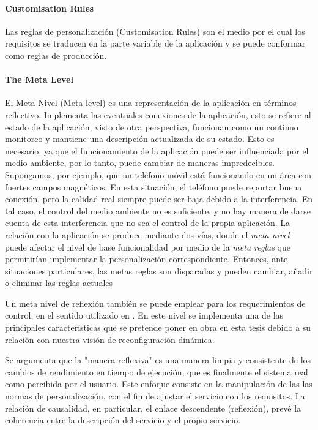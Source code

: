 \paragraph{Customisation Rules}

Las reglas de personalización (Customisation Rules) son el medio por el cual los requisitos se traducen en la parte variable de la aplicación y se puede conformar como reglas de producción.


\paragraph{The Meta Level}

El Meta Nivel (Meta level) es una representación de la aplicación en términos reflectivo. Implementa las eventuales conexiones de la aplicación, esto se refiere al estado de la aplicación, visto de otra perspectiva, funcionan como
un continuo monitoreo y mantiene una descripción actualizada de su estado. Esto es necesario, ya que el funcionamiento de la aplicación puede ser influenciada por el medio ambiente, por lo tanto, puede cambiar de maneras impredecibles. Supongamos, por ejemplo, que un teléfono móvil está funcionando en un área con fuertes campos magnéticos. En esta situación, el teléfono puede reportar buena conexión, pero la calidad real siempre puede ser baja debido a la interferencia. En tal caso, el control del medio ambiente no es suficiente, y no hay manera de darse cuenta de esta interferencia que no sea el control de la propia aplicación. La relación con la aplicación se produce mediante dos vías, donde el \textit{meta nivel } puede afectar el nivel de base funcionalidad por medio de la \textit{meta reglas} que permitirían implementar la personalización correspondiente. Entonces, ante situaciones particulares, las metas reglas son disparadas y pueden cambiar, añadir o eliminar las reglas actuales

Un meta nivel de reflexión también se puede emplear para los requerimientos de control, en el sentido utilizado en \cite{UWA5}. En este nivel se implementa una de las principales características que se pretende poner en obra en esta tesis debido a su relación con nuestra visión de reconfiguración dinámica. 

Se argumenta que la "manera reflexiva" es una manera limpia y consistente de los cambios de rendimiento en tiempo de ejecución, que es finalmente el sistema real como percibida por el usuario. Este enfoque consiste en la manipulación de las
las normas de personalización, con el fin de ajustar el servicio con los requisitos. La relación de causalidad, en particular,
el enlace descendente (reflexión), prevé la coherencia entre la descripción del servicio y el propio servicio.

